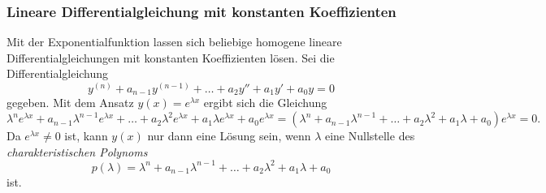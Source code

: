 %
%
\subsubsection{Lineare Differentialgleichung mit konstanten Koeffizienten}
Mit der Exponentialfunktion lassen sich beliebige homogene lineare
Differentialgleichungen mit konstanten Koeffizienten lösen.
%
Sei die Differentialgleichung
\[
y^{(n)} + a_{n-1}y^{(n-1)} + \dots + a_2y'' + a_1y' + a_0y = 0
\]
gegeben.
Mit dem Ansatz $y(x)=e^{\lambda x}$ ergibt sich die Gleichung
\[
\lambda^n e^{\lambda x}
+
a_{n-1}\lambda^{n-1} e^{\lambda x}
+
\dots
+
a_2\lambda^2e^{\lambda x}
+
a_1\lambda e^{\lambda x}
+
a_0e^{\lambda x}
=
(\lambda^n + a_{n-1}\lambda^{n-1} + \dots + a_2\lambda^2 + a_1\lambda + a_0)
e^{\lambda x}
=
0.
\]
Da $e^{\lambda x}\ne 0$ ist, kann $y(x)$ nur dann eine Lösung sein, wenn
$\lambda$ eine Nullstelle des {\em charakteristischen Polynoms}
%
\[
p(\lambda)
=
\lambda^n
+
a_{n-1}\lambda^{n-1}
+
\dots
+
a_2\lambda^2
+
a_1\lambda
+
a_0
\]
ist.

%
%

